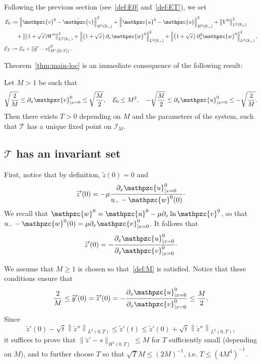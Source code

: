 \documentclass[AHL,Unicode,longabstracts,published]{cedram}
\newcommand{\R}{\mathbb{R}}
\newcommand{\p}{\partial}
\newcommand{\bv}{\bar{\mathpzc{v}}}
\newcommand{\bu}{\bar{\mathpzc{u}}}
\newcommand{\cE}{\mathcal E}
\newcommand{\cT}{\mathcal T}
\newcommand{\cI}{\mathcal I}
\newcommand{\tv}{\mathpzc{v}}
\newcommand{\tu}{\mathpzc{u}}
\newcommand{\tw}{\mathpzc{w}}
\newcommand{\ty}{\widetilde{y}}
\newcommand{\tz}{\widetilde{z}}
\begin{document}
Following the previous section (see~\eqref{def:E0} and~\eqref{def:ET}), we set
\begin{align*}
\cE_0&:=\left\|\tv^0 - \bv\right\|_{H^3(\R_+)}^2 + \left\|\tu^0-\bu\right\|_{H^3(\R_+)}^2 +\left\|V^0\right\|_{L^2(\R_+)}^2 \\
&\quad + \left\|(1+\sqrt{x}) W^0\right\|_{L^2(\R_+)}^2 + \left\|\left(1+\sqrt{x}\right) \p_x\tw^0\right\|_{L^2(\R_+)}^2 + \left\|\left(1+\sqrt{x}\right)\partial_x^2\tw^0\right\|_{L^2(\R_+)}^2,\\
\cE_T&:=\cE_0 + \left\|\ty'-s\right\|_{H^1([0,T])}^2.
\end{align*}



Theorem~\ref{thm:main-loc} is an immediate consequence of the following result:

\begin{prop}\label{prop:fixed-pt}
Let $M > 1$ be such that
\begin{equation}\label{def:M}
\sqrt{\frac{2}{M}}\leq \p_x \tv^0_{|x=0}\leq \sqrt{\frac{M}{2}}, \quad \cE_0\leq M^2, \quad -\sqrt{\frac{M}{2}}\leq \p_x \tu^0_{|x=0}\leq - \sqrt{\frac{2}{M}}.
\end{equation} Then there exists $T > 0$ depending on $M$ and the parameters of the system, such that $\cT$ has a unique fixed point on $\cI_M$.
\end{prop}



\subsection{\texorpdfstring{$\cT$}{T} has an invariant set}



First, notice that by definition, $\tz(0)=0$ and
\[
\tz'(0)= -\mu \frac{ \p_x \tu^0_{|x=0}}{u_- - \tw^0(0)} \cdot
\]
We recall that $\tw^0=\tu^0 - \mu \p_x \ln \tv^0$, so that $u_- - \tw^0(0) = \mu \p_x \tv^0_{|x=0}$. It follows that
\[
\tz'(0)=-\frac{\p_x \tu^0_{|x=0}}{\p_x \tv^0_{|x=0}} \cdot
\]


We assume that $M\geq 1$ is chosen so that~\eqref{def:M} is satisfied. Notice that these conditions ensure that
\[
\frac{2}{M}
\leq \ty'(0) = \tz'(0) = - \frac{\p_x \tu^0_{|x=0}}{\p_x \tv^0_{|x=0}}\leq \frac{M}{2}.
\]
Since
\[
\tz'(0) - \sqrt{t}\left\|\tz''\right\|_{L^2(0,T)}\leq \tz'(t)\leq \tz'(0) + \sqrt{t}\left\|\tz''\right\|_{L^2(0,T)},
\]
it suffices to prove that $\|\tz'-s\|_{H^1(0,T)}\leq M$ for $T$ sufficiently small (depending on $M$), and to further choose $T$ so that $\sqrt{T} M \leq (2M)^{-1}$, i.e. $T \leq (4 M^4)^{-1}.$
\end{document}
